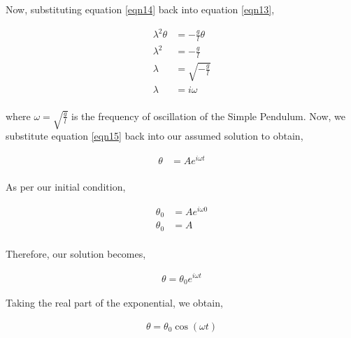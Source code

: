 \documentclass[12pt]{article}
\begin{document}
Now, substituting equation \ref{eqn14} back into equation \ref{eqn13},

\begin{equation} \label{eqn15}
    \begin{split}
        \lambda^{2} \theta &= - \frac{g}{l} \theta  \\
        \lambda^{2} &= - \frac{g}{l} \\
        \lambda &= \sqrt{- \frac{g}{l}} \\
        \lambda &=  i \omega \\
    \end{split}
\end{equation}

where $\omega = \sqrt{\frac{g}{l}}$ is the frequency of oscillation of the Simple Pendulum.
Now, we substitute equation \ref{eqn15} back into our assumed solution to obtain,

\begin{equation} \label{eqn16}
    \begin{split}
       \theta &= A e^{i \omega t} \\
    \end{split}
\end{equation}

As per our initial condition,

\begin{equation} \label{eqn17}
    \begin{split}
      \theta_{0} &= A e^{i \omega 0} \\
      \theta_{0} &= A \\
    \end{split}
\end{equation}

Therefore, our solution becomes,

\begin{equation} \label{eqn18}
    \begin{split}
        \theta = \theta_{0} e^{i \omega t}
    \end{split}
\end{equation}

Taking the real part of the exponential, we obtain,

\begin{equation} \label{eqn19}
    \begin{split}
        \theta = \theta_{0} \cos{ (\omega t) }
    \end{split}
\end{equation}
\end{document}
